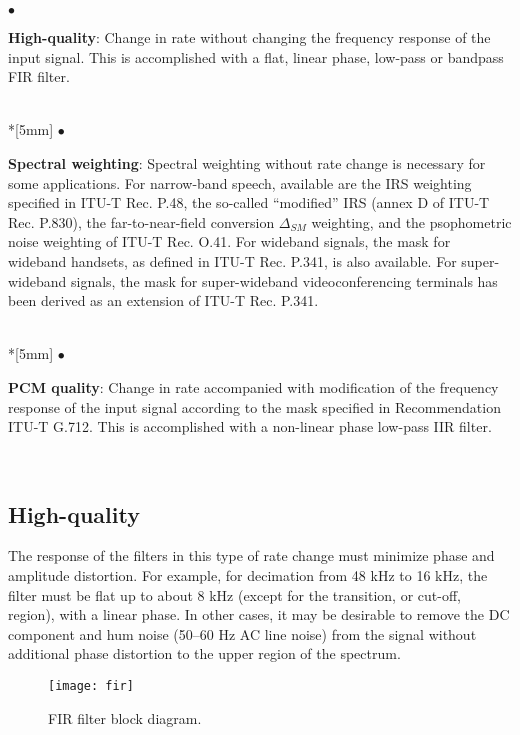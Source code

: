 \begin{minipage}{150mm}
 $\bullet$ \parbox[t]{140mm}{
               {\bf High-quality}: Change in rate without changing the
               frequency response of the input signal. This is
               accomplished with a flat, linear phase, low-pass or bandpass
               FIR filter.}\\*[5mm]
 $\bullet$ \parbox[t]{140mm}{
               {\bf Spectral weighting}: Spectral weighting without
               rate change is necessary for some applications. For
               narrow-band speech, available are the IRS weighting
               specified in ITU-T Rec.  P.48, the so-called ``modified''
               IRS (annex D of ITU-T Rec.  P.830), the
               far-to-near-field conversion $\Delta_{SM}$ weighting,
               and the psophometric noise weighting of ITU-T
               Rec. O.41. For wideband signals, the mask for wideband
               handsets, as defined in ITU-T Rec. P.341, is also
               available. For super-wideband signals, the mask for
               super-wideband videoconferencing terminals
                has been derived as an extension of ITU-T Rec. P.341.}\\*[5mm]
 $\bullet$ \parbox[t]{140mm}{
   {\bf PCM quality}: Change in rate accompanied with modification of the frequency response of the input signal according to the mask specified in Recommendation ITU-T G.712.
   This is accomplished with a non-linear phase low-pass IIR filter.}\\
\end{minipage}


\subsection{High-quality}

The response of the filters in this type of rate change must minimize
phase and amplitude distortion. For example, for decimation from 48
kHz to 16 kHz, the filter must be flat up to about 8 kHz (except for
the transition, or cut-off, region), with a linear phase. In other
cases, it may be desirable to remove the DC component and hum noise
(50--60 Hz AC line noise) from the signal without additional
phase distortion to the upper region of the spectrum.

\begin{figure}[hb]
  \begin{center}
    \texttt{[image: fir]}
  \end{center}
  \caption{\SF FIR filter block diagram.\label{FIR-filter}}
\end{figure}

